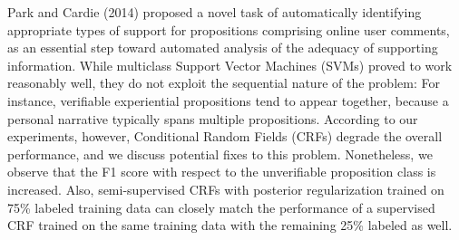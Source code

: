 Park and Cardie (2014) proposed a novel task of automatically identifying appropriate types of support for propositions comprising online user comments, as an essential step toward automated analysis of the adequacy of supporting information. While multiclass Support Vector Machines (SVMs) proved to work reasonably well, they do not exploit the sequential nature of the problem: For instance, verifiable experiential propositions tend to appear together, because a personal narrative typically spans multiple propositions. According to our experiments, however, Conditional Random Fields (CRFs) degrade the overall performance, and we discuss potential fixes to this problem. Nonetheless, we observe that the F1 score with respect to the unverifiable proposition class is increased. Also, semi-supervised CRFs with posterior regularization trained on 75\% labeled training data can closely match the performance of a supervised CRF trained on the same training data with the remaining 25\% labeled as well.

